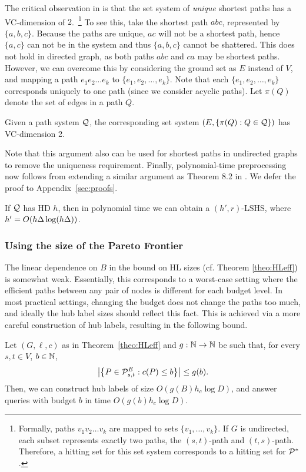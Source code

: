 The critical observation in \cite{highway2013} is that the set system of \emph{unique} shortest paths has a VC-dimension of $2$.~\footnote{
	Formally, paths $v_1v_2\ldots v_k$ are mapped to sets $\{v_1,\ldots,v_k\}$. If $G$ is undirected, each subset represents exactly two paths, the $(s,t)$-path and $(t,s)$-path. Therefore, a hitting set for this set system corresponds to a hitting set for $\PS$.}
To see this, take the shortest path $abc$, represented by $\{a,b,c\}$. Because the paths are unique, $ac$ will not be a shortest path, hence $\{a,c\}$ can not be in the system and thus $\{a,b,c\}$ cannot be shattered.
This does not hold in directed graph, as both paths $abc$ and $ca$ may be shortest paths. However, we can overcome this by considering the ground set as $E$ instead of $V$, and mapping a path $e_1e_2\ldots e_k$ to $\{e_1,e_2,\ldots,e_k\}$.
Note that each $\{e_1,e_2,\ldots,e_k\}$ corresponds uniquely to one path (since we consider acyclic paths).
Let $\pi(Q)$ denote the set of edges in a path $Q$.
\begin{proposition}
	Given a path system $\calQ$, the corresponding set system $(E,\{\pi(Q):Q\in\calQ\})$ has VC-dimension 2.
\end{proposition}
Note that this argument also can be used for shortest paths in undirected graphs to remove the uniqueness requirement.
Finally, polynomial-time preprocessing now follows from extending a similar argument as Theorem 8.2 in \cite{highway2013}.
We defer the proof to Appendix~\ref{sec:proofs}.

\begin{proposition}\label{prop:poly_lshs}
	If $\calQ$ has HD $h$, then in polynomial time we can obtain a $(h',r)$-LSHS, where $h'=\Or(h\Delta\log(h\Delta))$.	
\end{proposition}


\subsubsection{Using the size of the Pareto Frontier}
\label{ssec:frontier}

The linear dependence on $B$ in the bound on HL sizes (cf. Theorem \ref{theo:HLeff}) is somewhat weak. Essentially, this corresponds to a worst-case setting where the efficient paths between any pair of nodes is different for each budget level. 
In most practical settings, changing the budget does not change the paths too much, and ideally the hub label sizes should reflect this fact. 
This is achieved via a more careful construction of hub labels, resulting in the following bound. 
\begin{theorem}\label{thm:markedhubs}
	Let $(G,\ell,c)$ as in Theorem~\ref{theo:HLeff} and $g:\N\to \N$ be such that, for every $s,t\in V$, $b\in \N$,
	\[
	\abs*{\crl*{P\in\Pst^E: c(P)\leq b}} \leq g(b).
	\]
	Then, we can construct hub labels of size $O(g(B)h_c\log D)$, and answer queries with budget $b$ in time $O(g(b)h_c\log D)$.
\end{theorem}

